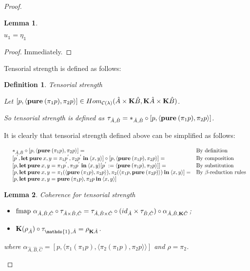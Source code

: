 \documentclass[a4paper]{article}
\newtheorem{lemma}{Lemma}
\newtheorem{defin}{Definition}
\begin{document}
\begin{proof}
\begin{lemma}
  $ $

  $u_{\mathds{1}} = \eta_{\mathds{1}}$

\end{lemma}

\begin{proof}

  Immediately.
\end{proof}

  Tensorial strength is defined as follows:

\begin{defin} Tensorial strength
  $ $

  Let $[p, \langle {\bf pure \:} (\pi_1 p), \pi_2 p \rangle] \in Hom_{\mathcal{C}(\lambda)}(\hat{A} \times {\bf K}\hat{B}, {\bf K}\hat{A} \times {\bf K}\hat{B})$.

  So tensorial strength is defined as $\tau_{\hat{A}, \hat{B}} = \ast_{\hat{A}, \hat{B}} \circ [p, \langle {\bf pure \:} (\pi_1 p), \pi_2 p \rangle]$.
\end{defin}

It is clearly that tensorial strength defined above can be simplified as follows:

$\begin{array}{lll}
&\ast_{\hat{A}, \hat{B}} \circ [p, \langle {\bf pure \:} (\pi_1 p), \pi_2 p \rangle] = & \text{By definition} \\
&[p^{'}, {\bf let \: pure \:} x, y = \pi_1 p^{'}, \pi_2 p^{'} {\: \bf in \:} \langle x, y \rangle] \circ [p, \langle {\bf pure \:} (\pi_1 p), \pi_2 p \rangle] = & \text{By composition} \\
&[p, {\bf let \: pure \:} x, y = \pi_1 p^{'}, \pi_2 p^{'} {\: \bf in \:} \langle x, y \rangle [p^{'} := \langle {\bf pure \:} (\pi_1 p), \pi_2 p \rangle]] = & \text{By substitution} \\
&[p, {\bf let \: pure \:} x, y = \pi_1 (\langle {\bf pure \:} (\pi_1 p), \pi_2 p \rangle), \pi_2 (\langle \pi_1 p, {\bf pure \:} (\pi_2 p) \rangle) {\: \bf in \:} \langle x, y \rangle] = & \text{By $\beta$-reduction rules} \\
&[p, {\bf let \: pure \:} x, y = {\bf pure \:} (\pi_1 p), \pi_2 p {\: \bf in \:} \langle x, y \rangle]&
\end{array}$

\begin{lemma} Coherence for tensorial strength

  \begin{itemize}
    \item $\text{fmap } \alpha_{\hat{A},\hat{B},\hat{C}} \circ \tau_{\hat{A} \times \hat{B}, \hat{C}} = \tau_{\hat{A}, \hat{B} \times \hat{C}} \circ (id_{\hat{A}} \times \tau_{\hat{B}, \hat{C}}) \circ \alpha_{\hat{A}, \hat{B}, {\bf K}\hat{C}}$;
    \item ${\bf K}(\rho_{\hat{A}}) \circ \tau_{\mathds{1}, \hat{A}} = \rho_{{\bf K}\hat{A}}$.
  \end{itemize}
  where $\alpha_{\hat{A},\hat{B},\hat{C}} = [p, \langle \pi_1 (\pi_1 p), \langle \pi_2 (\pi_1 p), \pi_2 p \rangle \rangle]$ and
  $\rho = \pi_2$.
\end{lemma}


\end{proof}
\end{document}
